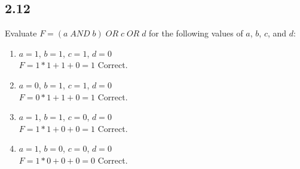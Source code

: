 \documentclass{article}
\begin{document}
\subsection*{2.12}
Evaluate $F = (a \; AND \; b) \; OR \; c \; OR \; d$ for the following values of $a$, $b$, $c$, and $d$:
\begin{enumerate}
    \item $a = 1$, $b = 1$, $c = 1$, $d = 0$ \\
    $ F = 1*1 + 1 + 0 = 1 $ \textcolor{mygreen}{Correct.}
    \item $a = 0$, $b = 1$, $c = 1$, $d = 0$ \\
    $ F = 0*1 + 1 + 0 = 1 $ \textcolor{mygreen}{Correct.}
    \item $a = 1$, $b = 1$, $c = 0$, $d = 0$ \\
    $ F = 1*1 + 0 + 0 = 1 $ \textcolor{mygreen}{Correct.}
    \item $a = 1$, $b = 0$, $c = 0$, $d = 0$ \\
    $ F = 1*0 + 0 + 0 = 0 $ \textcolor{mygreen}{Correct.}
\end{enumerate}
\end{document}
